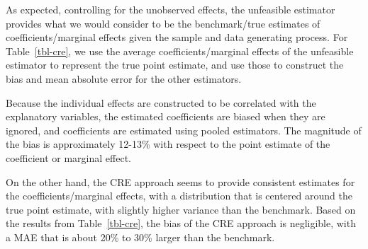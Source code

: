 \documentclass[bib]{statapress}
\begin{document}
As expected, controlling for the unobserved effects, the unfeasible
estimator provides what we would consider to be the benchmark/true
estimates of coefficients/marginal effects given the sample and data
generating process. For Table~\ref{tbl-cre}, we use the average
coefficients/marginal effects of the unfeasible estimator to represent
the true point estimate, and use those to construct the bias and mean
absolute error for the other estimators.

Because the individual effects are constructed to be correlated with the
explanatory variables, the estimated coefficients are biased when they
are ignored, and coefficients are estimated using pooled estimators. The
magnitude of the bias is approximately 12-13\% with respect to the point
estimate of the coefficient or marginal effect.

On the other hand, the CRE approach seems to provide consistent
estimates for the coefficients/marginal effects, with a distribution
that is centered around the true point estimate, with slightly higher
variance than the benchmark. Based on the results from
Table~\ref{tbl-cre}, the bias of the CRE approach is negligible, with a
MAE that is about 20\% to 30\% larger than the benchmark.
\end{document}
